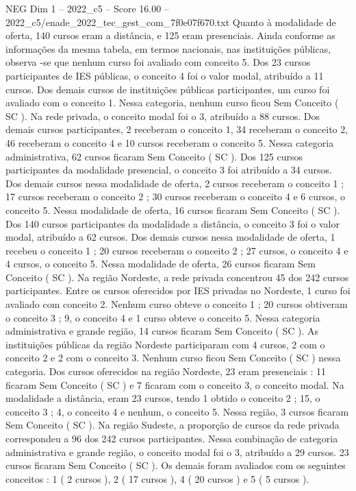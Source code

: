 \begin{textsample}{NEG Dim 1 – 2022\_c5 – Score 16.00 – 2022\_c5/enade\_2022\_tec\_gest\_com\_7f0e07f670.txt}
Quanto à modalidade de oferta, 140 cursos eram a distância, e 125 eram presenciais.
Ainda conforme as informações da mesma tabela, em termos nacionais, nas instituições públicas, observa -se que nenhum curso foi avaliado com conceito 5.
Dos 23 cursos participantes de IES públicas, o conceito 4 foi o valor modal, atribuído a 11 cursos.
Dos demais cursos de instituições públicas participantes, um curso foi avaliado com o conceito 1.
Nessa categoria, nenhum curso ficou Sem Conceito ( SC ).
Na rede privada, o conceito modal foi o 3, atribuído a 88 cursos.
Dos demais cursos participantes, 2 receberam o conceito 1, 34 receberam o conceito 2, 46 receberam o conceito 4 e 10 cursos receberam o conceito 5.
Nessa categoria administrativa, 62 cursos ficaram Sem Conceito ( SC ).
Dos 125 cursos participantes da modalidade presencial, o conceito 3 foi atribuído a 34 cursos.
Dos demais cursos nessa modalidade de oferta, 2 cursos receberam o conceito 1 ; 17 cursos receberam o conceito 2 ; 30 cursos receberam o conceito 4 e 6 cursos, o conceito 5.
Nessa modalidade de oferta, 16 cursos ficaram Sem Conceito ( SC ).
Dos 140 cursos participantes da modalidade a distância, o conceito 3 foi o valor modal, atribuído a 62 cursos.
Dos demais cursos nessa modalidade de oferta, 1 recebeu o conceito 1 ; 20 cursos receberam o conceito 2 ; 27 cursos, o conceito 4 e 4 cursos, o conceito 5.
Nessa modalidade de oferta, 26 cursos ficaram Sem Conceito ( SC ).
Na região Nordeste, a rede privada concentrou 45 dos 242 cursos participantes.
Entre os cursos oferecidos por IES privadas no Nordeste, 1 curso foi avaliado com conceito 2.
Nenhum curso obteve o conceito 1 ; 20 cursos obtiveram o conceito 3 ; 9, o conceito 4 e 1 curso obteve o conceito 5.
Nessa categoria administrativa e grande região, 14 cursos ficaram Sem Conceito ( SC ).
As instituições públicas da região Nordeste participaram com 4 cursos, 2 com o conceito 2 e 2 com o conceito 3.
Nenhum curso ficou Sem Conceito ( SC ) nessa categoria.
Dos cursos oferecidos na região Nordeste, 23 eram presenciais : 11 ficaram Sem Conceito ( SC ) e 7 ficaram com o conceito 3, o conceito modal.
Na modalidade a distância, eram 23 cursos, tendo 1 obtido o conceito 2 ; 15, o conceito 3 ; 4, o conceito 4 e nenhum, o conceito 5.
Nessa região, 3 cursos ficaram Sem Conceito ( SC ).
Na região Sudeste, a proporção de cursos da rede privada correspondeu a 96 dos 242 cursos participantes.
Nessa combinação de categoria administrativa e grande região, o conceito modal foi o 3, atribuído a 29 cursos. 23 cursos ficaram Sem Conceito ( SC ).
Os demais foram avaliados com os seguintes conceitos : 1 ( 2 cursos ), 2 ( 17 cursos ), 4 ( 20 cursos ) e 5 ( 5 cursos ).

\end{textsample}
